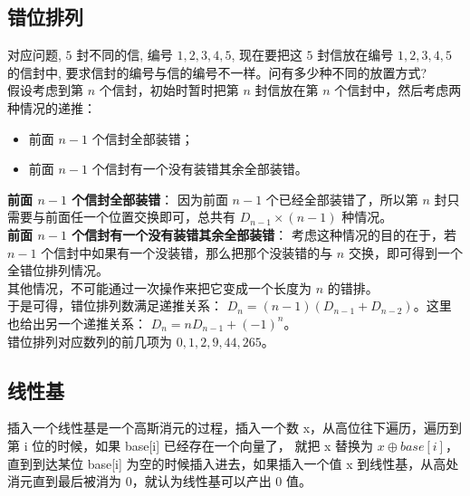 \documentclass[a4paper,12pt]{article}
\begin{document}
\subsection{错位排列}

\noindent 对应问题, $5$ 封不同的信, 编号 $1,2,3,4,5$, 现在要把这 $5$ 封信放在编号 $1,2,3,4,5$ 的信封中,
要求信封的编号与信的编号不一样。问有多少种不同的放置方式? \\

\noindent 假设考虑到第 \( n \) 个信封，初始时暂时把第 \( n \) 封信放在第 \( n \) 个信封中，然后考虑两种情况的递推：

\begin{itemize}
    \item 前面 \( n - 1 \) 个信封全部装错；
    \item 前面 \( n - 1 \) 个信封有一个没有装错其余全部装错。
\end{itemize} 


\noindent \textbf{前面 \( n - 1 \) 个信封全部装错}：
因为前面 \( n - 1 \) 个已经全部装错了，所以第 \( n \) 封只需要与前面任一个位置交换即可，总共有
\(
D_{n-1} \times (n - 1)
\)
种情况。\\

\noindent \textbf{前面 \( n - 1 \) 个信封有一个没有装错其余全部装错}：
考虑这种情况的目的在于，若 \( n - 1 \) 个信封中如果有一个没装错，那么把那个没装错的与 \( n \) 交换，即可得到一个全错位排列情况。\\


\noindent 其他情况，不可能通过一次操作来把它变成一个长度为 \( n \) 的错排。 \\

\noindent 于是可得，错位排列数满足递推关系：
\(
D_n = (n - 1)(D_{n-1} + D_{n-2})
\)。这里也给出另一个递推关系：
\(
D_n = nD_{n-1} + (-1)^n
\)。 \\

\noindent 错位排列对应数列的前几项为 $0,1,2,9,44,265$。 \\

\subsection{线性基}

\noindent 插入一个线性基是一个高斯消元的过程，插入一个数 x，从高位往下遍历，遍历到第 i 位的时候，如果 base[i] 已经存在一个向量了，
就把 x 替换为 \(x \oplus base[i]\)，直到到达某位 base[i] 为空的时候插入进去，如果插入一个值 x 到线性基，从高处消元直到最后被消为 0，就认为线性基可以产出 0 值。\\
\end{document}
